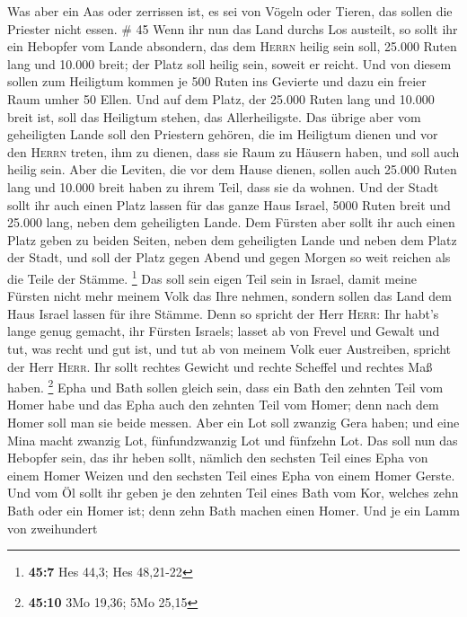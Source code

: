  Was aber ein Aas oder zerrissen ist, es sei von Vögeln
oder Tieren, das sollen die Priester nicht essen. \# 45 
Wenn ihr nun das Land durchs Los austeilt, so sollt ihr ein Hebopfer vom
Lande absondern, das dem \textsc{Herrn} heilig sein soll, 25.000 Ruten
lang und 10.000 breit; der Platz soll heilig sein, soweit er reicht.
 Und von diesem sollen zum Heiligtum kommen je 500 Ruten
ins Gevierte und dazu ein freier Raum umher 50 Ellen.  Und
auf dem Platz, der 25.000 Ruten lang und 10.000 breit ist, soll das
Heiligtum stehen, das Allerheiligste.  Das übrige aber vom
geheiligten Lande soll den Priestern gehören, die im Heiligtum dienen
und vor den \textsc{Herrn} treten, ihm zu dienen, dass sie Raum zu
Häusern haben, und soll auch heilig sein.  Aber die
Leviten, die vor dem Hause dienen, sollen auch 25.000 Ruten lang und
10.000 breit haben zu ihrem Teil, dass sie da wohnen.  Und
der Stadt sollt ihr auch einen Platz lassen für das ganze Haus Israel,
5000 Ruten breit und 25.000 lang, neben dem geheiligten Lande.
 Dem Fürsten aber sollt ihr auch einen Platz geben zu
beiden Seiten, neben dem geheiligten Lande und neben dem Platz der
Stadt, und soll der Platz gegen Abend und gegen Morgen so weit reichen
als die Teile der Stämme. \footnote{\textbf{45:7} Hes 44,3; Hes 48,21-22}
 Das soll sein eigen Teil sein in Israel, damit meine
Fürsten nicht mehr meinem Volk das Ihre nehmen, sondern sollen das Land
dem Haus Israel lassen für ihre Stämme.  Denn so spricht
der Herr \textsc{Herr}: Ihr habt's lange genug gemacht, ihr Fürsten
Israels; lasset ab von Frevel und Gewalt und tut, was recht und gut ist,
und tut ab von meinem Volk euer Austreiben, spricht der Herr
\textsc{Herr}.  Ihr sollt rechtes Gewicht und rechte
Scheffel und rechtes Maß haben. \footnote{\textbf{45:10} 3Mo 19,36; 5Mo
  25,15}  Epha und Bath sollen gleich sein, dass ein Bath
den zehnten Teil vom Homer habe und das Epha auch den zehnten Teil vom
Homer; denn nach dem Homer soll man sie beide messen. 
Aber ein Lot soll zwanzig Gera haben; und eine Mina macht zwanzig Lot,
fünfundzwanzig Lot und fünfzehn Lot.  Das soll nun das
Hebopfer sein, das ihr heben sollt, nämlich den sechsten Teil eines Epha
von einem Homer Weizen und den sechsten Teil eines Epha von einem Homer
Gerste.  Und vom Öl sollt ihr geben je den zehnten Teil
eines Bath vom Kor, welches zehn Bath oder ein Homer ist; denn zehn Bath
machen einen Homer.  Und je ein Lamm von zweihundert
